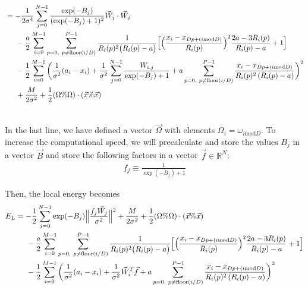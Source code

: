 \documentclass[12pt]{article}
\begin{document}
\begin{align*}
&=-\frac{1}{2\sigma^4} \sum_{j=0}^{N-1}\frac{\exp(-B_j)}{(\exp(-B_j)+1)^2} \vec{W}_j \cdot \vec{W}_j \\
& \hspace*{.5 cm}
-\frac{a}{2} \sum_{i=0}^{M-1} \sum_{p=0, \ p\neq \text{floor}(i/D)}^{P-1}\frac{1}{R_i(p)^2 \big( R_i(p)-a \big)}\Big[ \Big( \frac{x_i-x_{Dp+(i\text{mod}D)}}{R_i(p)} \Big)^2 \frac{2a-3R_i(p)}{R_i(p)-a}+1\Big]  \\
& \hspace*{.5 cm}
-\frac{1}{2} \sum_{i=0}^{M-1} \bigg( 
\frac{1}{\sigma^2} (a_i -x_i )
+\frac{1}{\sigma^2} \sum_{j=0}^{N-1}  \frac{W_{i,j}}{\exp(-B_j)+1}
+a\sum_{p=0, \ p\neq \text{floor}(i/D)}^{P-1} \frac{x_i-x_{Dp+(i\text{mod}D)}}{R_i(p)^2 \left( R_i(p) -a \right)}
 \bigg)^2\\
 & \hspace*{.5 cm} + \frac{M}{2\sigma^2}+ \frac{1}{2}(\Omega\%\Omega)\cdot (\vec{x}\% \vec{x})\\ \\ 
\end{align*}

\noindent In the last line, we have defined a vector $\vec{\Omega}$ with elements $\Omega_i = \omega_{i\text{mod}D}$. To increase the computational speed, we will precalculate and store the values $B_j$ in a vector $\vec{B}$ and store the following factors in a vector $\vec{f} \in \mathbb{R}^{N}$:
\begin{align*}
f_j \equiv \frac{1}{\exp(-B_j)+1}
\end{align*}

\noindent Then, the local energy becomes
\begin{align*}
E_L &=-\frac{1}{2} \sum_{j=0}^{N-1}\exp(-B_j) \Big\| \frac{f_j\vec{W}_j}{\sigma^2} \Big\|^2 + \frac{M}{2\sigma^2}+ \frac{1}{2}(\Omega\%\Omega)\cdot (\vec{x}\% \vec{x})\\
& \hspace*{.5 cm}
-\frac{a}{2} \sum_{i=0}^{M-1} \sum_{p=0, \ p\neq \text{floor}(i/D)}^{P-1}\frac{1}{R_i(p)^2 \big( R_i(p)-a \big)}\Big[ \Big( \frac{x_i-x_{Dp+(i\text{mod}D)}}{R_i(p)} \Big)^2 \frac{2a-3R_i(p)}{R_i(p)-a}+1\Big]  \\
& \hspace*{.5 cm}
-\frac{1}{2} \sum_{i=0}^{M-1} \bigg( 
\frac{1}{\sigma^2}(a_i -x_i )
+\frac{1}{\sigma^2} \vec{W}_i^T\vec{f}
+a\sum_{p=0, \ p\neq \text{floor}(i/D)}^{P-1} \frac{x_i-x_{Dp+(i\text{mod}D)}}{R_i(p)^2 \left( R_i(p) -a \right)}
 \bigg)^2\\
\end{align*}
\end{document}
